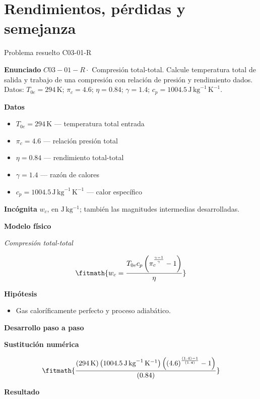 \documentclass[10pt,openany]{book}
\begin{document}
\chapter{Rendimientos, pérdidas y semejanza}
\begin{studiumworked}{Problema resuelto C03-01-R}


\noindent\textbf{Enunciado}
\(C03-01-R \cdot\) Compresión total-total. Calcule temperatura total de salida y trabajo de una compresión con relación de presión y rendimiento dados. Datos: \(T_{0e}=294\, \mathrm{K}\); \(\pi_c=4.6\); \(\eta=0.84\); \(\gamma=1.4\); \(c_p=1004.5\, \mathrm{J}\,\mathrm{kg}^{-1}\,\mathrm{K}^{-1}\).

\noindent\textbf{Datos}
\begin{itemize}
\item $T_{0e} = 294\,\mathrm{K}$ — temperatura total entrada
\item $\pi_c = 4.6$ — relación presión total
\item $\eta = 0.84$ — rendimiento total-total
\item $\gamma = 1.4$ — razón de calores
\item $c_p = 1004.5\,\mathrm{J}\,\mathrm{kg}^{-1}\,\mathrm{K}^{-1}$ — calor específico
\end{itemize}

\noindent\textbf{Incógnita}
$w_c$, en $\mathrm{J\,kg^{-1}}$; también las magnitudes intermedias desarrolladas.

\noindent\textbf{Modelo físico}

\noindent\textit{Compresión total-total}

\[
\fitmath{w_c=\frac{T_{0e} c_p \left(\pi_c^{\frac{\gamma - 1}{\gamma}} - 1\right)}{\eta}}
\]

\noindent\textbf{Hipótesis}
\begin{itemize}
\item Gas caloríficamente perfecto y proceso adiabático.
\end{itemize}

\noindent\textbf{Desarrollo paso a paso}



\noindent\textbf{Sustitución numérica}

\[
\fitmath{\frac{\left(294\,\mathrm{K}\right) \left(1004.5\,\mathrm{J}\,\mathrm{kg}^{-1}\,\mathrm{K}^{-1}\right) \left(\left(4.6\right)^{\frac{\left(1.4\right) - 1}{\left(1.4\right)}} - 1\right)}{\left(0.84\right)}}
\]

\noindent\textbf{Resultado}


\end{studiumworked}
\end{document}
